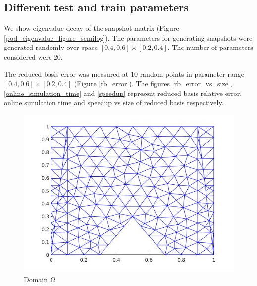 \documentclass[a4paper,oneside,openright,spanish,english]{book}
\begin{document}
\subsection{Different test and train parameters}

We show eigenvalue decay of the snapshot matrix (Figure \ref{pod_eigenvalue_figure_semilog}). The parameters for generating snapshots were generated randomly over space $[0.4,0.6] \times [0.2,0.4]$. The number of parameters considered were $20$. 

The reduced basis error was measured at $10$ random points in parameter range $[0.4,0.6] \times [0.2,0.4]$ (Figure \ref{rb_error}). The figures \ref{rb_error_vs_size}, \ref{online_simulation_time} and \ref{speedup} represent reduced basis relative error, online simulation time and speedup vs size of reduced basis respectively.

\begin{figure}
  \includegraphics[width=\linewidth]{pod_figure.jpg}
  \caption{Domain $\Omega$} 
  \label{pod_figure}
\end{figure}
\end{document}
